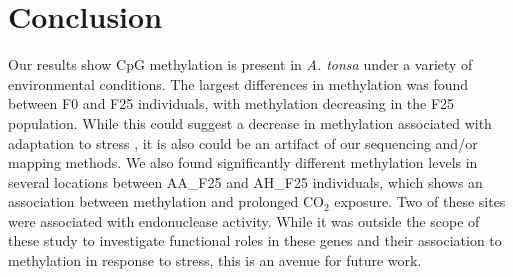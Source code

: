 \documentclass[11pt]{scrartcl}
\begin{document}
\section{Conclusion}
\label{sec:conclusion}

Our results show CpG methylation is present in \textit{A. tonsa} under
a variety of environmental conditions. The largest differences in
methylation was found between F0 and F25 individuals, with methylation
decreasing in the F25 population. While this could suggest a decrease
in methylation associated with adaptation to stress \cite{Cao2011}, it
is also could be an artifact of our sequencing and/or mapping
methods. We also found significantly different methylation levels in
several locations between AA\_F25 and AH\_F25 individuals, which shows
an association between methylation and prolonged CO$_2$ exposure. Two
of these sites were associated with endonuclease activity. While it
was outside the scope of these study to investigate functional roles
in these genes and their association to methylation in response to
stress, this is an avenue for future work.

\newpage



\end{document}
